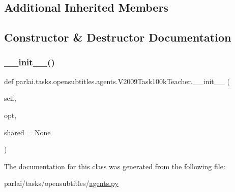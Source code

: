 \subsection*{Additional Inherited Members}


\subsection{Constructor \& Destructor Documentation}
\mbox{\label{classparlai_1_1tasks_1_1opensubtitles_1_1agents_1_1V2009Task100kTeacher_a99fe8e12c849b677378eb7ed8c18f344}} 
\subsubsection{\texorpdfstring{\+\_\+\+\_\+init\+\_\+\+\_\+()}{\_\_init\_\_()}}
{\footnotesize\ttfamily def parlai.\+tasks.\+opensubtitles.\+agents.\+V2009\+Task100k\+Teacher.\+\_\+\+\_\+init\+\_\+\+\_\+ (\begin{DoxyParamCaption}\item[{}]{self,  }\item[{}]{opt,  }\item[{}]{shared = {\ttfamily None} }\end{DoxyParamCaption})}



The documentation for this class was generated from the following file\+:\begin{DoxyCompactItemize}
\item 
parlai/tasks/opensubtitles/\hyperlink{parlai_2tasks_2opensubtitles_2agents_8py}{agents.\+py}\end{DoxyCompactItemize}
